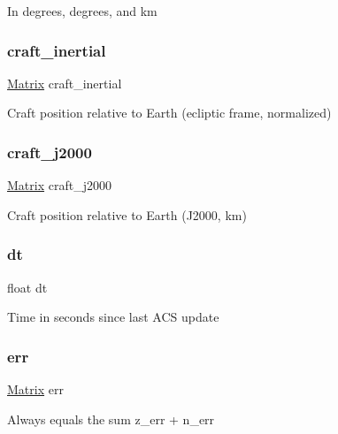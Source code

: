 In degrees, degrees, and km \mbox{\label{struct_a_c_s_type_a5840add97f160c6362779a0651f8d47e}} 
\subsubsection{\texorpdfstring{craft\_inertial}{craft\_inertial}}
{\footnotesize\ttfamily \mbox{\hyperlink{struct___matrix}{Matrix}} craft\+\_\+inertial}

Craft position relative to Earth (ecliptic frame, normalized) \mbox{\label{struct_a_c_s_type_acc172ef9300af5fed7b539c0ff77d675}} 
\subsubsection{\texorpdfstring{craft\_j2000}{craft\_j2000}}
{\footnotesize\ttfamily \mbox{\hyperlink{struct___matrix}{Matrix}} craft\+\_\+j2000}

Craft position relative to Earth (J2000, km) \mbox{\label{struct_a_c_s_type_a778e38aa889751afffa2dea6b803e67a}} 
\subsubsection{\texorpdfstring{dt}{dt}}
{\footnotesize\ttfamily float dt}

Time in seconds since last A\+CS update \mbox{\label{struct_a_c_s_type_a1dbe9014e616749d7c55f3ba4cbbff65}} 
\subsubsection{\texorpdfstring{err}{err}}
{\footnotesize\ttfamily \mbox{\hyperlink{struct___matrix}{Matrix}} err}

Always equals the sum z\+\_\+err + n\+\_\+err \mbox{\label{struct_a_c_s_type_a4041a720dac4049e6c883ed9b0d654ba}} 
